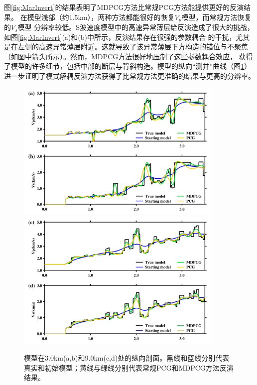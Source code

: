 图\ref{fig:MarInvert}的结果表明了MDPCG方法比常规PCG方法能提供更好的反演结果。
在模型浅部（约1.5km），两种方法都能很好的恢复$V_p$模型，而常规方法恢复的$V_s$模型
分辨率较低。S波速度模型中的高速异常薄层给反演造成了很大的挑战，如图\ref{fig:MarInvert}(a)和(b)中所示，反演结果存在很强的参数耦合
的干扰，尤其是在左侧的高速异常薄层附近。这就导致了该异常薄层下方构造的错位与不聚焦（如图中箭头所示）。然而，MDPCG方法很好地压制了这些参数耦合效应，
获得了模型的许多细节，包括中部的断层与背斜构造。模型的纵向“测井”曲线（图\ref{fig:VertiProfile}）
进一步证明了模式解耦反演方法获得了比常规方法更准确的结果与更高的分辨率。
\begin{figure}[!htb]
	\begin{center}
		{\includegraphics[width=10cm]{Figure/chapter02/tariqsugresult/Fig/new3km.pdf}}
		{\includegraphics[width=10cm]{Figure/chapter02/tariqsugresult/Fig/new9km.pdf}}
		\caption{
		模型在3.0km(a,b)和9.0km(c,d)处的纵向剖面。黑线和蓝线分别代表真实和初始模型；黄线与绿线分别代表常规PCG和MDPCG方法反演结果。
	}
	\label{fig:VertiProfile}
	\end{center}
\end{figure}

